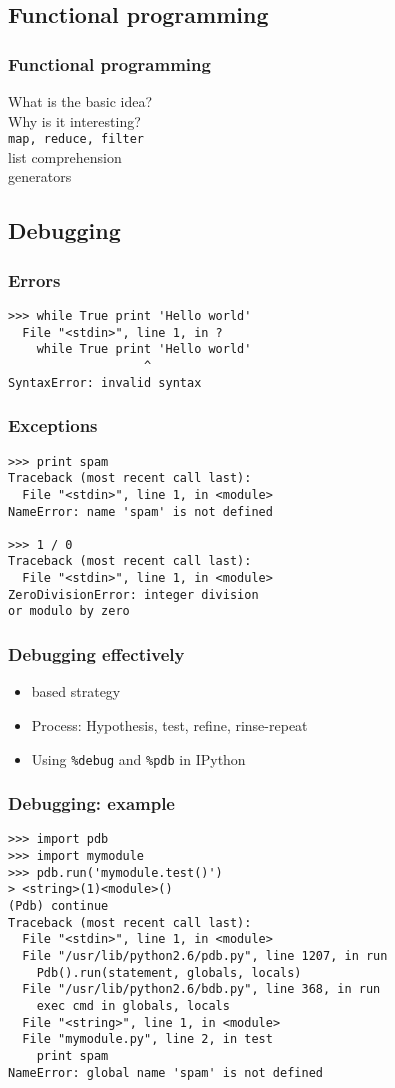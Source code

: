 \documentclass[14pt,compress]{beamer}
\newcounter{time}
\newcommand{\inctime}[1]{\addtocounter{time}{#1}{\tiny \thetime\ m}}
\newcommand{\typ}[1]{\texttt{#1}}
\newcommand{\kwrd}[1]{ \texttt{\textbf{\color{blue}{#1}}}  }
\begin{document}
\subsection{Functional programming}
\begin{frame}[fragile]
    \frametitle{Functional programming}
What is the basic idea?\\
Why is it interesting?\\
\typ{map, reduce, filter}\\
list comprehension\\
generators
    \inctime{10} 
\end{frame}

\subsection{Debugging}
\begin{frame}[fragile]
 \frametitle{Errors}
 \begin{lstlisting}
>>> while True print 'Hello world'
  File "<stdin>", line 1, in ?
    while True print 'Hello world'
                   ^
SyntaxError: invalid syntax
\end{lstlisting}
\end{frame}

\begin{frame}[fragile]
 \frametitle{Exceptions}
 \begin{lstlisting}
>>> print spam
Traceback (most recent call last):
  File "<stdin>", line 1, in <module>
NameError: name 'spam' is not defined

>>> 1 / 0
Traceback (most recent call last):
  File "<stdin>", line 1, in <module>
ZeroDivisionError: integer division 
or modulo by zero
\end{lstlisting}
\end{frame}

\begin{frame}[fragile]
    \frametitle{Debugging effectively}

    \begin{itemize}
        \item  \kwrd{print} based strategy
        \item Process: Hypothesis, test, refine, rinse-repeat
        \item Using \typ{\%debug} and \typ{\%pdb} in IPython
    \end{itemize}
    \inctime{10} 
\end{frame}

\begin{frame}[fragile]
\frametitle{Debugging: example}
\small
\begin{lstlisting}
>>> import pdb
>>> import mymodule
>>> pdb.run('mymodule.test()')
> <string>(1)<module>()
(Pdb) continue
Traceback (most recent call last):
  File "<stdin>", line 1, in <module>
  File "/usr/lib/python2.6/pdb.py", line 1207, in run
    Pdb().run(statement, globals, locals)
  File "/usr/lib/python2.6/bdb.py", line 368, in run
    exec cmd in globals, locals
  File "<string>", line 1, in <module>
  File "mymodule.py", line 2, in test
    print spam
NameError: global name 'spam' is not defined
\end{lstlisting}
\end{frame}
\end{document}
